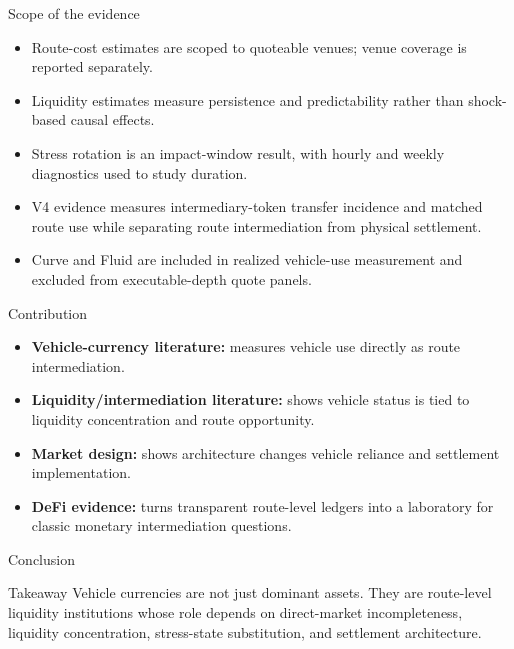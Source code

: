 \documentclass[aspectratio=169,11pt]{beamer}
\begin{document}
\begin{frame}{Scope of the evidence}
\begin{itemize}
  \item Route-cost estimates are scoped to quoteable venues; venue coverage is reported separately.
  \item Liquidity estimates measure persistence and predictability rather than shock-based causal effects.
  \item Stress rotation is an impact-window result, with hourly and weekly diagnostics used to study duration.
  \item V4 evidence measures intermediary-token transfer incidence and matched route use while separating route intermediation from physical settlement.
  \item Curve and Fluid are included in realized vehicle-use measurement and excluded from executable-depth quote panels.
\end{itemize}
\end{frame}

\begin{frame}{Contribution}
\begin{itemize}
  \item \textbf{Vehicle-currency literature:} measures vehicle use directly as route intermediation.
  \item \textbf{Liquidity/intermediation literature:} shows vehicle status is tied to liquidity concentration and route opportunity.
  \item \textbf{Market design:} shows architecture changes vehicle reliance and settlement implementation.
  \item \textbf{DeFi evidence:} turns transparent route-level ledgers into a laboratory for classic monetary intermediation questions.
\end{itemize}
\end{frame}

\begin{frame}{Conclusion}
\begin{block}{Takeaway}
Vehicle currencies are not just dominant assets. They are route-level liquidity institutions whose role depends on direct-market incompleteness, liquidity concentration, stress-state substitution, and settlement architecture.
\end{block}
\end{frame}
\end{document}
